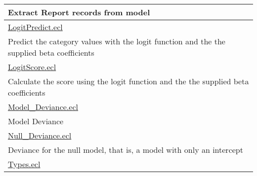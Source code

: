 {\begin{longtable}{|p{\textwidth}|}
Extract Report records from model \\
\hline
\hyperlink{ecldoc:toc:LogitPredict}{LogitPredict.ecl} \\
Predict the category values with the logit function and the the supplied beta coefficients \\
\hline
\hyperlink{ecldoc:toc:LogitScore}{LogitScore.ecl} \\
Calculate the score using the logit function and the the supplied beta coefficients \\
\hline
\hyperlink{ecldoc:toc:Model_Deviance}{Model\_Deviance.ecl} \\
Model Deviance \\
\hline
\hyperlink{ecldoc:toc:Null_Deviance}{Null\_Deviance.ecl} \\
Deviance for the null model, that is, a model with only an intercept \\
\hline
\hyperlink{ecldoc:toc:Types}{Types.ecl} \\
\hline
\end{longtable}
}



















